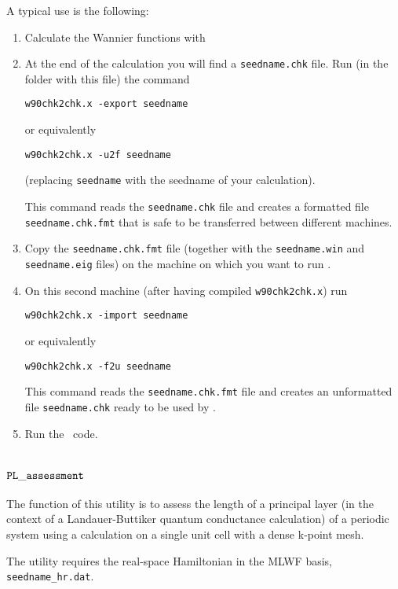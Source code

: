 A typical use is the following:
\begin{enumerate}
\item Calculate the Wannier functions with \wannier
\item At the end of the calculation you will find a \verb|seedname.chk|
  file. Run (in the folder with this file) the command
\begin{verbatim}
w90chk2chk.x -export seedname
\end{verbatim}
or equivalently
\begin{verbatim}
w90chk2chk.x -u2f seedname
\end{verbatim}
(replacing \verb|seedname| with the seedname of your calculation).

This command reads the \verb|seedname.chk| file and creates a
formatted file  \verb|seedname.chk.fmt| that is safe to be transferred
between different machines.
\item Copy the \verb|seedname.chk.fmt| file (together with the
  \verb|seedname.win| and \verb|seedname.eig| files) on the machine on
  which you want to run \postw.
\item On this second machine (after having compiled
  \verb|w90chk2chk.x|) run
\begin{verbatim}
w90chk2chk.x -import seedname
\end{verbatim}
or equivalently
\begin{verbatim}
w90chk2chk.x -f2u seedname
\end{verbatim}

This command reads the \verb|seedname.chk.fmt| file and creates an
unformatted file  \verb|seedname.chk| ready to be used by \postw.

\item Run the \postw\ code.

\end{enumerate}


\section{$\tt{PL\_assessment}$}
\label{sec:pl_assessment}

The function of this utility is to assess the length of a principal
layer (in the context of a Landauer-Buttiker quantum conductance
calculation) of a periodic system using a calculation on a single unit
cell with a dense k-point mesh.

The utility requires the real-space Hamiltonian in the MLWF basis,
\verb|seedname_hr.dat|. 

